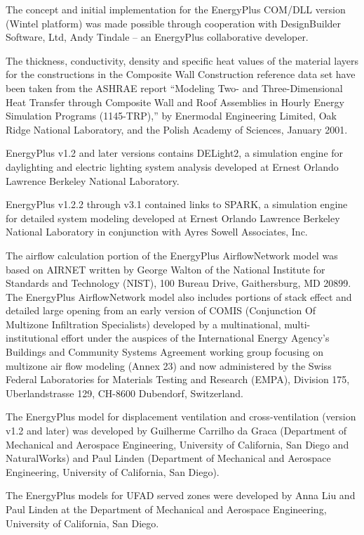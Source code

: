 The concept and initial implementation for the EnergyPlus COM/DLL version (Wintel platform) was made possible through cooperation with DesignBuilder Software, Ltd, Andy Tindale -- an EnergyPlus collaborative developer.

The thickness, conductivity, density and specific heat values of the material layers for the constructions in the Composite Wall Construction reference data set have been taken from the ASHRAE report ``Modeling Two- and Three-Dimensional Heat Transfer through Composite Wall and Roof Assemblies in Hourly Energy Simulation Programs (1145-TRP),'' by Enermodal Engineering Limited, Oak Ridge National Laboratory, and the Polish Academy of Sciences, January 2001.

EnergyPlus v1.2 and later versions contains DELight2, a simulation engine for daylighting and electric lighting system analysis developed at Ernest Orlando Lawrence Berkeley National Laboratory.

EnergyPlus v1.2.2 through v3.1 contained links to SPARK, a simulation engine for detailed system modeling developed at Ernest Orlando Lawrence Berkeley National Laboratory in conjunction with Ayres Sowell Associates, Inc.

The airflow calculation portion of the EnergyPlus AirflowNetwork model was based on AIRNET written by George Walton of the National Institute for Standards and Technology (NIST), 100 Bureau Drive, Gaithersburg, MD 20899. The EnergyPlus AirflowNetwork model also includes portions of stack effect and detailed large opening from an early version of COMIS (Conjunction Of Multizone Infiltration Specialists) developed by a multinational, multi-institutional effort under the auspices of the International Energy Agency's Buildings and Community Systems Agreement working group focusing on multizone air flow modeling (Annex 23) and now administered by the Swiss Federal Laboratories for Materials Testing and Research (EMPA), Division 175, Uberlandstrasse 129, CH-8600 Dubendorf, Switzerland.

The EnergyPlus model for displacement ventilation and cross-ventilation (version v1.2 and later) was developed by Guilherme Carrilho da Graca (Department of Mechanical and Aerospace Engineering, University of California, San Diego and NaturalWorks) and Paul Linden (Department of Mechanical and Aerospace Engineering, University of California, San Diego).

The EnergyPlus models for UFAD served zones were developed by Anna Liu and Paul Linden at the Department of Mechanical and Aerospace Engineering, University of California, San Diego.

